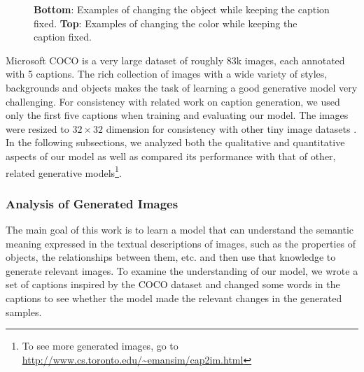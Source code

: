 \documentclass{article} %
\begin{document}
\begin{figure}[!t]
\begin{center}
\quad
%
\quad
%
\end{center}
\caption{\textbf{Bottom}: Examples of changing the object while keeping the caption fixed. \textbf{Top}: Examples of changing the color while keeping the caption fixed.}
\label{fig:genimages3}
\end{figure}

Microsoft COCO \citep{mscoco} is a very large dataset of roughly 83k images, each annotated with 5 captions. The rich collection of images with a wide variety of styles, backgrounds and objects makes the task of learning a good generative model 
very challenging. For consistency with related work on caption generation, we used only the first five captions when training and evaluating our model. 
The images were resized to $32 \times 32$ dimension for consistency with other tiny image datasets \citep{krizhevsky_cifar}. In the following subsections, we analyzed both the qualitative and quantitative aspects of our model as well as compared its performance with that of other, related generative models\footnote{To see more generated images, go to \url{http://www.cs.toronto.edu/~emansim/cap2im.html}}.

\subsubsection{Analysis of Generated Images}
The main goal of this work is to learn a model that can understand the semantic meaning expressed in the textual descriptions of images, such as the properties of objects, the relationships between them, etc. and then use that knowledge to generate relevant images. To examine the understanding of our model, we wrote a set of captions inspired by the COCO dataset and changed some words in the captions to see whether the model made the relevant changes in the generated samples.
\end{document}

